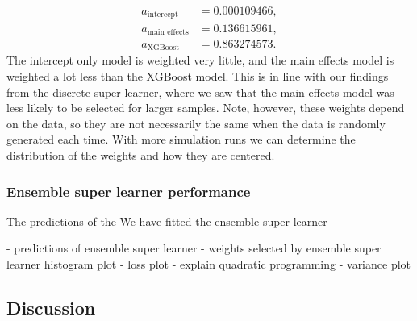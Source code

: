 \documentclass[./main.tex]{subfiles}
\begin{document}
\begin{align*}
    a_{\text{intercept}} &= 0.000109466, \\
    a_{\text{main effects}} &= 0.136615961, \\
    a_{\text{XGBoost}} &= 0.863274573.
\end{align*}
The intercept only model is weighted very little, and the main effects model is weighted a lot less than the XGBoost model. This is in line with our findings from the discrete super learner, where we saw that the main effects model was less likely to be selected for larger samples. Note, however, these weights depend on the data, so they are not necessarily the same when the data is randomly generated each time. With more simulation runs we can determine the distribution of the weights and how they are centered. 


\subsubsection{Ensemble super learner performance}
The predictions of the 
We have fitted the ensemble super learner 

- predictions of ensemble super learner
- weights selected by ensemble super learner histogram plot
- loss plot
- explain quadratic programming
- variance plot


\subsection{Discussion}
\end{document}
